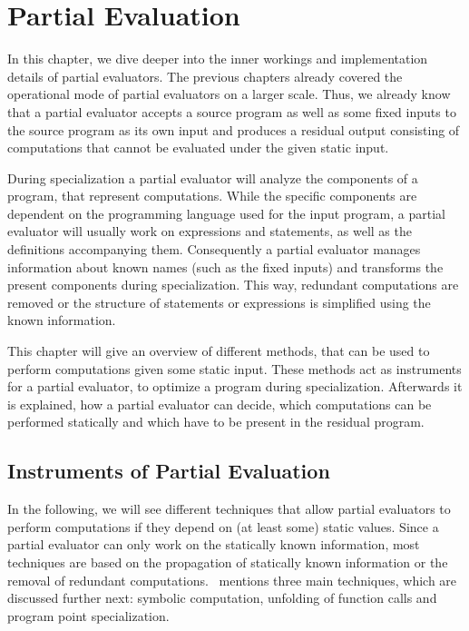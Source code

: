 
\section{Partial Evaluation}\label{sec:partial-evaluation}

In this chapter, we dive deeper into the inner workings and implementation details of partial evaluators.
The previous chapters already covered the operational mode of partial evaluators on a larger scale.
Thus, we already know that a partial evaluator accepts a source program as well as some fixed inputs to the source program as its own input and produces a residual output consisting of computations that cannot be evaluated under the given static input.

During specialization a partial evaluator will analyze the components of a program, that represent computations.
While the specific components are dependent on the programming language used for the input program, a partial evaluator will usually work on expressions and statements, as well as the definitions accompanying them.
Consequently a partial evaluator manages information about known names (such as the fixed inputs) and transforms the present components during specialization.
This way, redundant computations are removed or the structure of statements or expressions is simplified using the known information.

This chapter will give an overview of different methods, that can be used to perform computations given some static input.
These methods act as instruments for a partial evaluator, to optimize a program during specialization.
Afterwards it is explained, how a partial evaluator can decide, which computations can be performed statically and which have to be present in the residual program.


\subsection{Instruments of Partial Evaluation}\label{sec:pe-instruments}

In the following, we will see different techniques that allow partial evaluators to perform computations if they depend on (at least some) static values.
Since a partial evaluator can only work on the statically known information, most techniques are based on the propagation of statically known information or the removal of redundant computations.
\cite[Chap. 1]{Jones_PartialEvaluation}~mentions three main techniques, which are discussed further next: symbolic computation, unfolding of function calls and program point specialization.

